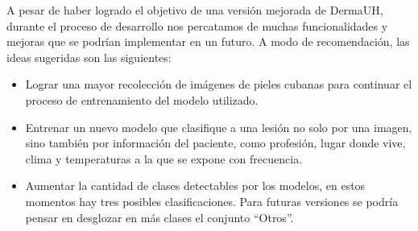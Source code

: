 \begin{recomendations}
    A pesar de haber logrado el objetivo de una versi\'on mejorada de DermaUH, 
    durante el proceso de desarrollo nos percatamos de muchas funcionalidades y 
    mejoras que se podr\'ian implementar en un futuro. A modo de recomendaci\'on,
    las ideas sugeridas son las siguientes:
    \begin{itemize}
        \item Lograr una mayor recolecci\'on de im\'agenes de pieles cubanas para continuar el proceso de entrenamiento del modelo utilizado.
        \item Entrenar un nuevo modelo que clasifique a una lesi\'on no solo por una imagen, sino tambi\'en por informaci\'on del paciente, como profesi\'on, lugar donde vive, clima y temperaturas a la que se expone con frecuencia.
        \item Aumentar la cantidad de clases detectables por los modelos, en estos momentos hay tres posibles clasificaciones. Para futuras versiones se podr\'ia pensar en desglozar en m\'as clases el conjunto ``Otros''.
    \end{itemize}
\end{recomendations}
